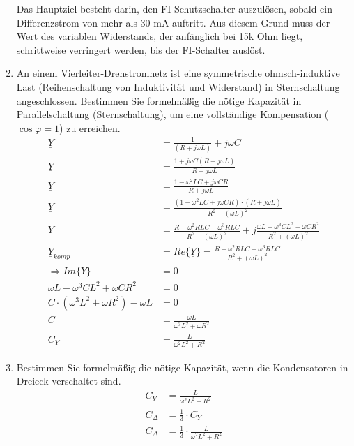 \begin{enumerate}[label=\alph*)]
	Das Hauptziel besteht darin, den FI-Schutzschalter auszulösen, sobald ein Differenzstrom von mehr als 30 mA auftritt. Aus diesem Grund muss der Wert des variablen Widerstands, der anfänglich bei 15k Ohm liegt, schrittweise verringert werden, bis der FI-Schalter auslöst.

  \item An einem Vierleiter-Drehstromnetz ist eine symmetrische ohmsch-induktive Last (Reihenschaltung von Induktivität und Widerstand) in Sternschaltung angeschlossen. Bestimmen Sie formelmäßig die nötige Kapazität in Parallelschaltung (Sternschaltung), um eine vollständige Kompensation ($\cos \varphi = 1$) zu erreichen. 
\begin{align*}
  \underline Y &=\frac{1}{(R+j\omega L)}+ {j\omega C}\\
  \underline Y &=\frac{1+ j\omega C(R+j\omega L)}{R+j\omega L}\\
  \underline Y &=\frac{1-\omega^2 LC+ j\omega CR}{R+j\omega L}\\
  \underline Y &=\frac{(1-\omega^2 LC+ j\omega CR) \cdot(R+j\omega L)}{R^2+(\omega L)^2}\\
  \underline Y &=\frac{R-\omega^2 RLC - \omega^3 RLC}{R^2+(\omega L)^2} 
  + j \frac{\omega L - \omega^3CL^2+\omega CR^2}{R^2+(\omega L)^2}\\
  \underline Y_{komp} &=Re\{\underline Y\}=\frac{R-\omega^2 RLC - \omega^3 RLC}{R^2+(\omega L)^2} \\
  \Rightarrow Im\{\underline Y\}&=0\\
  \omega L - \omega^3CL^2+\omega CR^2 &= 0\\
  C\cdot(\omega^3L^2+\omega R^2) - \omega L  &= 0\\
  C &=\frac{\omega L}{\omega^3 L^2+\omega R^2}\\
  C_{Y} &=\frac{L}{\omega^2 L^2+R^2}
\end{align*}

  \item Bestimmen Sie formelmäßig die nötige Kapazität, wenn die Kondensatoren in Dreieck verschaltet sind.
    \begin{align*}
      C_{Y} &=\frac{L}{\omega^2 L^2+R^2}\\
      C_{\Delta} &= \frac{1}{3}\cdot C_{Y}\\
      C_{\Delta} &= \frac{1}{3}\cdot \frac{L}{\omega^2 L^2+R^2}\\
    \end{align*}


\end{enumerate}

